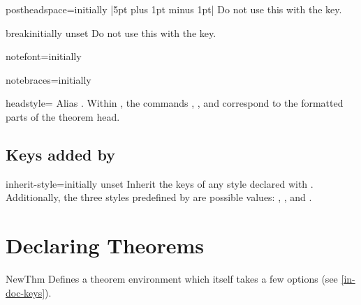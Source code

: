 \documentclass{ltxdoc}
\newcommand{\ttbrackets}[1]{\brackets{\texttt{#1}}}
\begin{document}
\begin{docKey}{postheadspace}{=}{initially |5pt plus 1pt minus 1pt|}
Do not use this with the  key.
\end{docKey}

\begin{docKey}{break}{}{initially unset}
Do not use this with the  key.
\end{docKey}

\begin{docKey}{notefont}{=}{initially }

\end{docKey}

\begin{docKey}{notebraces}{=}{initially \ttbrackets{(}\ttbrackets{)}}

\end{docKey}

\begin{docKey}{headstyle}{=\textbar{}\textbar{}}{}
Alias . Within , the commands , , and  correspond to the formatted parts of the theorem head.
\end{docKey}

\subsection{Keys added by }

\begin{docKey}{inherit-style}{=}{initially unset}
Inherit the keys of any style declared with . Additionally, the three styles predefined by  are possible values: , , and .
\end{docKey}

\section{Declaring Theorems}

\begin{docCommand}{NewThm}{}
Defines a theorem environment  which itself takes a few options (see \autoref{in-doc-keys}).
\end{docCommand}
\end{document}
